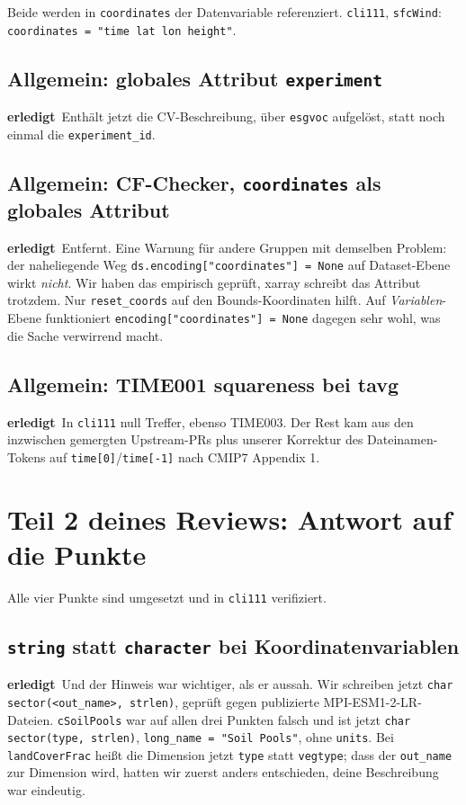 \documentclass[11pt,a4paper]{article}
\newcommand{\code}[1]{\texttt{\small #1}}
\newcommand{\ok}{\textcolor{green!45!black}{\textbf{erledigt}}}
\begin{document}
Beide werden in \code{coordinates} der Datenvariable referenziert.
\code{cli111}, \code{sfcWind}: \code{coordinates = "time lat lon height"}.

\subsection*{Allgemein: globales Attribut \code{experiment}}
\ok\ Enth\"alt jetzt die CV-Beschreibung, \"uber \code{esgvoc} aufgel\"ost, statt
noch einmal die \code{experiment\_id}.

\subsection*{Allgemein: CF-Checker, \code{coordinates} als globales Attribut}
\ok\ Entfernt. Eine Warnung f\"ur andere Gruppen mit demselben Problem: der
naheliegende Weg \code{ds.encoding["coordinates"] = None} auf Dataset-Ebene wirkt
\emph{nicht}. Wir haben das empirisch gepr\"uft, xarray schreibt das Attribut
trotzdem. Nur \code{reset\_coords} auf den Bounds-Koordinaten hilft. Auf
\emph{Variablen}-Ebene funktioniert \code{encoding["coordinates"] = None} dagegen
sehr wohl, was die Sache verwirrend macht.

\subsection*{Allgemein: TIME001 squareness bei tavg}
\ok\ In \code{cli111} null Treffer, ebenso TIME003. Der Rest kam aus den
inzwischen gemergten Upstream-PRs plus unserer Korrektur des Dateinamen-Tokens auf
\code{time[0]}/\code{time[-1]} nach CMIP7 Appendix 1.

\section{Teil 2 deines Reviews: Antwort auf die Punkte}

Alle vier Punkte sind umgesetzt und in \code{cli111} verifiziert.

\subsection*{\code{string} statt \code{character} bei Koordinatenvariablen}
\ok\ Und der Hinweis war wichtiger, als er aussah. Wir schreiben jetzt
\code{char sector(<out\_name>, strlen)}, gepr\"uft gegen publizierte
MPI-ESM1-2-LR-Dateien. \code{cSoilPools} war auf allen drei Punkten falsch und ist
jetzt \code{char sector(type, strlen)}, \code{long\_name = "Soil Pools"}, ohne
\code{units}. Bei \code{landCoverFrac} hei\ss t die Dimension jetzt \code{type} statt
\code{vegtype}; dass der \code{out\_name} zur Dimension wird, hatten wir zuerst
anders entschieden, deine Beschreibung war eindeutig.
\end{document}

